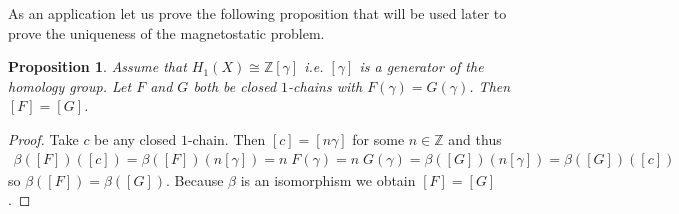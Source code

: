 \documentclass[12pt,a4paper]{article}
\newtheorem{proposition}{Proposition}
\theoremstyle{definition}
\newtheorem{definition}{Definition}
\newcommand{\integers}{\mathbb{Z}}
\newcommand{\real}{\mathbb{R}}
\begin{document}
As an application let us prove the following proposition that will be used 
later to prove the uniqueness of the magnetostatic problem. %
\begin{proposition} \label{uniqueness_cochain_class}
    Assume that $H_1(X) \cong \integers[\gamma]$ i.e. $[\gamma]$ is a generator
    of the homology group. Let $F$ and $G$ both be closed 
    $1$-chains with $F(\gamma)=G(\gamma)$. Then $[F] = [G]$.
\end{proposition} 
\begin{proof}
    Take $c$ be any closed $1$-chain. Then $[c] = [n\gamma]$ for some 
    $n\in \integers$ and thus
    \begin{align*}
        \beta([F])([c]) = \beta([F])(n[\gamma]) = 
        n\;F(\gamma) = n\;G(\gamma) = \beta([G])(n[\gamma]) = \beta([G])([c])
    \end{align*}
    so $\beta([F]) = \beta([G])$. Because $\beta$ is an isomorphism we obtain
    $[F] = [G]$.
\end{proof}


\end{document}
